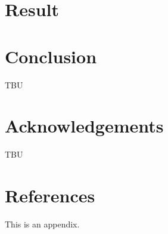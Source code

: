 \documentclass[11pt]{article}
\begin{document}
\section{Result}



\section{Conclusion}
TBU

\section{Acknowledgements}
TBU

\section{References}
\label{sec:appendix}

This is an appendix.
\end{document}
